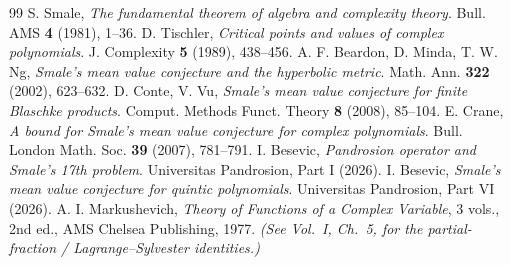\documentclass[11pt,a4paper]{article}
\begin{document}
\begin{thebibliography}{99}
 S. Smale, \textit{The fundamental theorem of algebra and complexity theory}. Bull. AMS \textbf{4} (1981), 1--36.
 D. Tischler, \textit{Critical points and values of complex polynomials}. J. Complexity \textbf{5} (1989), 438--456.
 A. F. Beardon, D. Minda, T. W. Ng, \textit{Smale's mean value conjecture and the hyperbolic metric}. Math. Ann. \textbf{322} (2002), 623--632.
 D. Conte, V. Vu, \textit{Smale's mean value conjecture for finite Blaschke products}. Comput. Methods Funct. Theory \textbf{8} (2008), 85--104.
 E. Crane, \textit{A bound for Smale's mean value conjecture for complex polynomials}. Bull. London Math. Soc. \textbf{39} (2007), 781--791.
 I. Besevic, \textit{Pandrosion operator and Smale's 17th problem}. Universitas Pandrosion, Part I (2026).
 I. Besevic, \textit{Smale's mean value conjecture for quintic polynomials}. Universitas Pandrosion, Part VI (2026).
 A. I. Markushevich, \textit{Theory of Functions of a Complex Variable}, 3 vols., 2nd ed., AMS Chelsea Publishing, 1977. \emph{(See Vol.\ I, Ch.~5, for the partial-fraction / Lagrange--Sylvester identities.)}
\end{thebibliography}
\end{document}
